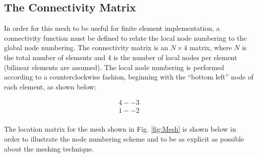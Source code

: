 \documentclass[10pt]{article}
\begin{document}
\subsection{The Connectivity Matrix}

In order for this mesh to be useful for finite element implementation, a connectivity function must be defined to relate the local node numbering to the global node numbering. The connectivity matrix is an \(N\times4\) matrix, where \(N\) is the total number of elements and 4 is the number of local nodes per element (bilinear elements are assumed). The local node numbering is performed according to a counterclockwise fashion, beginning with the ``bottom left'' node of each element, as shown below:

\begin{equation}
\begin{aligned}
4 -- 3 \\
1 -- 2 \\
\end{aligned}
\end{equation}

The location matrix for the mesh shown in Fig. \ref{fig:Mesh} is shown below in order to illustrate the node numbering scheme and to be as explicit as possible about the meshing technique.
\end{document}
